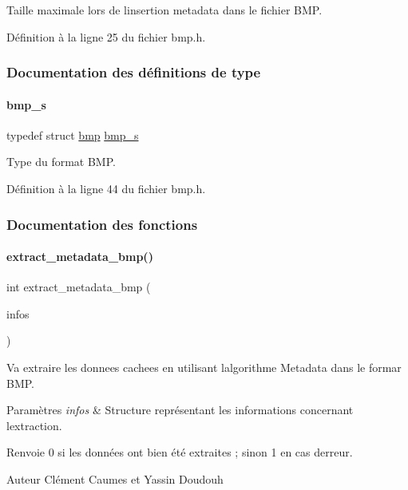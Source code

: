 Taille maximale lors de l\textquotesingle{}insertion metadata dans le fichier B\+MP. 

Définition à la ligne 25 du fichier bmp.\+h.



\subsubsection{Documentation des définitions de type}
\mbox{\label{a00077_afb8e06bb1e6eba33c97ae40d153a0a97}} 
\paragraph{\texorpdfstring{bmp\+\_\+s}{bmp\_s}}
{\footnotesize\ttfamily typedef struct \hyperlink{a00162}{bmp} \hyperlink{a00077_afb8e06bb1e6eba33c97ae40d153a0a97}{bmp\+\_\+s}}

Type du format B\+MP. 

Définition à la ligne 44 du fichier bmp.\+h.



\subsubsection{Documentation des fonctions}
\mbox{\label{a00077_a14e9a0ddec04cc168cbfe21cd839166e}} 
\paragraph{\texorpdfstring{extract\+\_\+metadata\+\_\+bmp()}{extract\_metadata\_bmp()}}
{\footnotesize\ttfamily int extract\+\_\+metadata\+\_\+bmp (\begin{DoxyParamCaption}\item[{\hyperlink{a00008_aa8ca908d92fb5bdd3c0a9e1f58b2cf03}{info\+\_\+s} $\ast$}]{infos }\end{DoxyParamCaption})}



Va extraire les donnees cachees en utilisant l\textquotesingle{}algorithme Metadata dans le formar B\+MP. 


\begin{DoxyParams}{Paramètres}
{\em infos} & Structure représentant les informations concernant l\textquotesingle{}extraction. \\
\hline
\end{DoxyParams}
\begin{DoxyReturn}{Renvoie}
0 si les données ont bien été extraites ; sinon 1 en cas d\textquotesingle{}erreur. 
\end{DoxyReturn}
\begin{DoxyAuthor}{Auteur}
Clément Caumes et Yassin Doudouh 
\end{DoxyAuthor}


